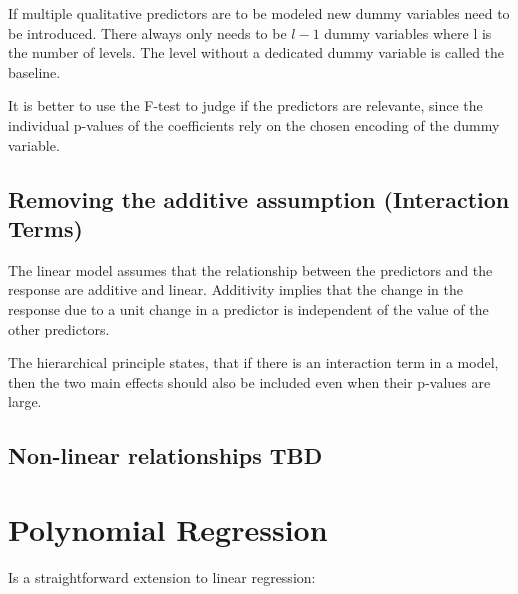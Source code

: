 \documentclass[../Main.tex]{subfiles}
\begin{document}
If multiple qualitative predictors are to be modeled new dummy variables need to be introduced.
There always only needs to be \(l-1\) dummy variables where l is the number of levels. The level
without a dedicated dummy variable is called the baseline.

It is better to use the F-test to judge if the predictors are relevante,
since the individual p-values of the coefficients rely on the chosen encoding of the dummy variable. 

\subsection{Removing the additive assumption (Interaction Terms)}
The linear model assumes that the relationship between the predictors and the response are additive and linear.
Additivity implies that the change in the response due to a unit change in a predictor is independent of the value
of the other predictors.


The hierarchical principle states, that if there is an interaction 
term in a model, then the two main effects should also be 
included even when their p-values are large.

\subsection{Non-linear relationships TBD}

\section{Polynomial Regression}
Is a straightforward extension to 
linear regression:
\end{document}
